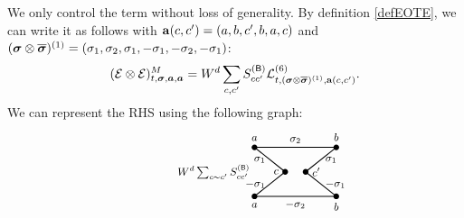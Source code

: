 We only control the term  without loss of generality. By definition \eqref{defEOTE}, we can write it as follows with ${\mathbf{a}}(c,c')=(a,b,c',b,a,c)$ and $({\boldsymbol{\sigma}}\otimes \overline{{\boldsymbol{\sigma}}})^{(1)} = (\sigma_1, \sigma_2, \sigma_1, -{\sigma}_1, -{\sigma}_2, -{\sigma}_1)$:
\begin{equation}\label{eq_mart-sum}
    (\mathcal{E} \otimes \mathcal{E})_{t, {\boldsymbol{\sigma}}, \boldsymbol{a}, \boldsymbol{a}}^M = W^d \sum_{c, c'}S^{({\mathsf{B}})}_{cc'} \mathcal{L}^{(6)}_{t, ({\boldsymbol{\sigma}}\otimes \overline{{\boldsymbol{\sigma}}})^{(1)}, {\mathbf{a}}(c,c')}.
\end{equation}
We can represent the RHS using the following graph: 
\begin{equation}\label{eq:2martingale_quad}
\parbox[c]{0.3\linewidth}{
\scalebox{0.95}{
\begin{tikzpicture}[scale=1.2, every node/.style={font=\small}]

\coordinate (a1) at (0, 1.2);
\fill (a1) circle (2pt) node[above=2pt]{$a$};

\coordinate (a2) at (2, 1.2);
\fill (a2) circle (2pt) node[above=2pt]{$b$};

\coordinate (b) at (0.75, 0.6);
\fill (b) circle (2pt) node[left=2pt]{$c$};

\coordinate (b') at (1.25, 0.6);
\fill (b') circle (2pt) node[right=2pt]{$c'$};

\coordinate (a1') at (0, 0);
\fill (a1') circle (2pt) node[below=2pt]{$a$};

\coordinate (a2') at (2, 0);
\fill (a2') circle (2pt) node[below=2pt]{$b$};

\node at (-1,0.6) {$W^d\sum_{c\sim c'}S_{cc'}^{(\sB)}$};

\draw[thick] (a1) -- (b) node[midway, left] {$\sig_1$};
 \draw[thick] (b') -- (a2) node[midway, right] {$\sig_1$};
\draw[thick] (b') -- (a2') node[midway, right] {$-\sig_1$};
 \draw[thick] (b) -- (a1') node[midway, left] {$-\sig_1$};
\draw[thick] (a1) -- (a2) node[midway, above] {$\sig_2$};
\draw[thick] (a1') -- (a2') node[midway, below] {$-\sig_2$};




\end{tikzpicture}}}
\end{equation}

